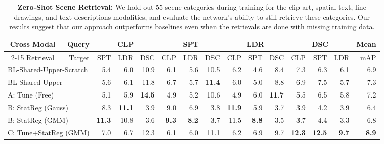 \documentclass[10pt,journal,compsoc]{IEEEtran}
\begin{document}
    
    \begin{table*}[t!]
        \centering
        \bgroup
		\def\arraystretch{1.3}%
        \scriptsize\begin{tabular}{|c|l||r r r||r r r||r r r||r r r||r|}
        	\hline
			\multirow{2}{*}{ Cross Modal} & \multicolumn{1}{|r||}{ Query} & \multicolumn{3}{|c||}{ CLP} & \multicolumn{3}{|c||}{ SPT} & \multicolumn{3}{|c||}{ LDR} & \multicolumn{3}{|c||}{ DSC} &{ Mean }\\ %
			\cline{2-15}
			Retrieval &		 \multicolumn{1}{|r||}{ Target} & { SPT}  & { LDR}  & { DSC}  & { CLP}  & { LDR}  & { DSC}  & { CLP}  & { SPT}  & { DSC}  &  { CLP}  & { SPT}  & { LDR}  & { mAP }\\ 
			\hline
         \multicolumn{2}{|l||}{BL-Shared-Upper-Scratch}       & 5.4 & 6.0 & 10.9 & 6.1 & 5.6 & 10.5 & 6.2 & 4.6 & 8.4 & 7.3 & 6.3 & 6.1 & 6.9\\
         \multicolumn{2}{|l||}{BL-Shared-Upper} & 5.6 & 6.1 & 11.8 & 6.7 & 5.7 & \bf{11.4} & 6.0 & 5.0 & 8.8 & 6.9 & 7.5 & 5.7 & 7.3\\ 
         \hline
        \multicolumn{2}{|l||}{A: Tune (Free)}       & 5.1 & 5.9 & \bf{14.5} & 4.9 & 5.2 & 10.6 & 4.9 & 6.0 & \bf{11.7} & 5.5 & 6.5 & 5.8 & 7.2\\ 
         \multicolumn{2}{|l||}{B: StatReg (Gauss)} & 8.3 & \bf{11.1} & 3.9 & 9.0 & 6.9 & 3.8 & \bf{11.9} & 5.9 & 3.7 & 3.9 & 4.2 & 3.9 & 6.4\\ 
        \multicolumn{2}{|l||}{B: StatReg (GMM)}     & \bf{11.3} & 10.8 & 3.6 & \bf{9.3} & \bf{8.2} & 3.7 & 11.5 & \bf{8.8} & 3.5 & 3.7 & 4.4 & 3.3 & 6.8\\ 
        
        \multicolumn{2}{|l||}{C: Tune+StatReg (GMM)}& 7.0 & 6.7 & 12.3 & 6.1 & 6.0 & 11.1 & 6.2 & 6.9 & 9.7 & \bf{12.3} & \bf{12.5} & \bf{9.7} & \bf\footnotesize{8.9}\\ 
        \hline
        \end{tabular}
        \egroup
        \caption{\textbf{Zero-Shot Scene Retrieval:}  We hold out $55$ scene categories during training for the clip art, spatial text, line drawings, and text descriptions modalities, and evaluate the network's ability to still retrieve these categories. Our results suggest that our approach outperforms baselines even when the retrievals are done with missing training data.}
        \label{tab:zs_scene_retrieval}
    \end{table*}
    
\end{document}
